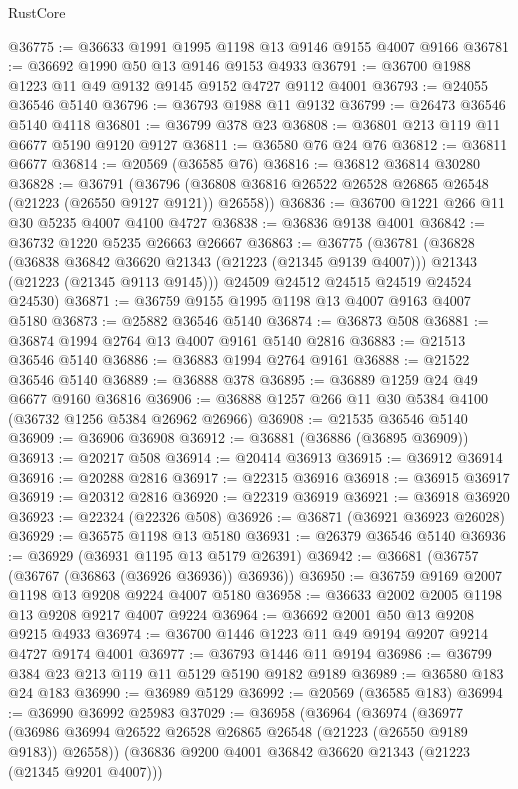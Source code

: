 \begin{lexlean}{RustCore}
\begin{coremodule}
@36775 := @36633 @1991 @1995 @1198 @13 @9146 @9155 @4007 @9166
@36781 := @36692 @1990 @50 @13 @9146 @9153 @4933
@36791 := @36700 @1988 @1223 @11 @49 @9132 @9145 @9152 @4727 @9112 @4001
@36793 := @24055 @36546 @5140
@36796 := @36793 @1988 @11 @9132
@36799 := @26473 @36546 @5140 @4118
@36801 := @36799 @378 @23
@36808 := @36801 @213 @119 @11 @6677 @5190 @9120 @9127
@36811 := @36580 @76 @24 @76
@36812 := @36811 @6677
@36814 := @20569 (@36585 @76)
@36816 := @36812 @36814 @30280
@36828 := @36791
    (@36796 (@36808 @36816 @26522 @26528 @26865 @26548 (@21223 (@26550 @9127 @9121)) @26558))
@36836 := @36700 @1221 @266 @11 @30 @5235 @4007 @4100 @4727
@36838 := @36836 @9138 @4001
@36842 := @36732 @1220 @5235 @26663 @26667
@36863 := @36775
    (@36781
      (@36828
        (@36838 @36842 @36620 @21343 (@21223 (@21345 @9139 @4007)))
        @21343
        (@21223 (@21345 @9113 @9145)))
      @24509
      @24512
      @24515
      @24519
      @24524
      @24530)
@36871 := @36759 @9155 @1995 @1198 @13 @4007 @9163 @4007 @5180
@36873 := @25882 @36546 @5140
@36874 := @36873 @508
@36881 := @36874 @1994 @2764 @13 @4007 @9161 @5140 @2816
@36883 := @21513 @36546 @5140
@36886 := @36883 @1994 @2764 @9161
@36888 := @21522 @36546 @5140
@36889 := @36888 @378
@36895 := @36889 @1259 @24 @49 @6677 @9160 @36816
@36906 := @36888 @1257 @266 @11 @30 @5384 @4100 (@36732 @1256 @5384 @26962 @26966)
@36908 := @21535 @36546 @5140
@36909 := @36906 @36908
@36912 := @36881 (@36886 (@36895 @36909))
@36913 := @20217 @508
@36914 := @20414 @36913
@36915 := @36912 @36914
@36916 := @20288 @2816
@36917 := @22315 @36916
@36918 := @36915 @36917
@36919 := @20312 @2816
@36920 := @22319 @36919
@36921 := @36918 @36920
@36923 := @22324 (@22326 @508)
@36926 := @36871 (@36921 @36923 @26028)
@36929 := @36575 @1198 @13 @5180
@36931 := @26379 @36546 @5140
@36936 := @36929 (@36931 @1195 @13 @5179 @26391)
@36942 := @36681 (@36757 (@36767 (@36863 (@36926 @36936)) @36936))
@36950 := @36759 @9169 @2007 @1198 @13 @9208 @9224 @4007 @5180
@36958 := @36633 @2002 @2005 @1198 @13 @9208 @9217 @4007 @9224
@36964 := @36692 @2001 @50 @13 @9208 @9215 @4933
@36974 := @36700 @1446 @1223 @11 @49 @9194 @9207 @9214 @4727 @9174 @4001
@36977 := @36793 @1446 @11 @9194
@36986 := @36799 @384 @23 @213 @119 @11 @5129 @5190 @9182 @9189
@36989 := @36580 @183 @24 @183
@36990 := @36989 @5129
@36992 := @20569 (@36585 @183)
@36994 := @36990 @36992 @25983
@37029 := @36958
    (@36964
      (@36974
        (@36977 (@36986 @36994 @26522 @26528 @26865 @26548 (@21223 (@26550 @9189 @9183)) @26558))
        (@36836 @9200 @4001 @36842 @36620 @21343 (@21223 (@21345 @9201 @4007)))

\end{coremodule}
\end{lexlean}
